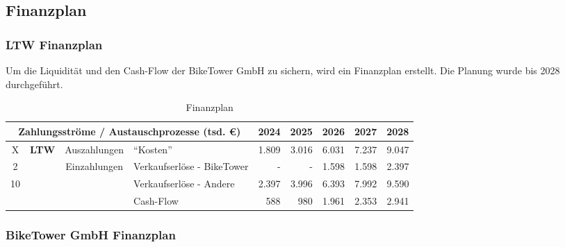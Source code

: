 \subsection{Finanzplan}

\subsubsection{LTW Finanzplan}

Um die Liquidität und den Cash-Flow der BikeTower GmbH zu sichern, wird ein Finanzplan erstellt. Die Planung wurde bis 2028 durchgeführt.

\begin{table}[H]
  \small
  \centering
  \begin{tabular}{ccclrrrrr}
    \toprule
    \multicolumn{4}{c}{\textbf{Zahlungsströme / Austauschprozesse} (tsd. \euro)} & \textbf{2024}                 & \textbf{2025}                 & \textbf{2026}              & \textbf{2027} & \textbf{2028}                         \\
    \midrule
    X                                                                            & \multirow{3}{*}{\textbf{LTW}} & Auszahlungen                  & \enquote{Kosten}           & 1.809         & 3.016         & 6.031 & 7.237 & 9.047 \\
    2                                                                            &                               & \multirow{2}{*}{Einzahlungen} & Verkaufserlöse - BikeTower & -             & -             & 1.598 & 1.598 & 2.397 \\
    10                                                                           &                               &                               & Verkaufserlöse - Andere    & 2.397         & 3.996         & 6.393 & 7.992 & 9.590 \\
    \midrule
                                                                                 &                               &                               & Cash-Flow                  & 588           & 980           & 1.961 & 2.353 & 2.941 \\

    \bottomrule
  \end{tabular}
  \caption{Finanzplan}
  \label{tab:finanzplan}
\end{table}

\clearpage
\subsubsection{BikeTower GmbH Finanzplan}

